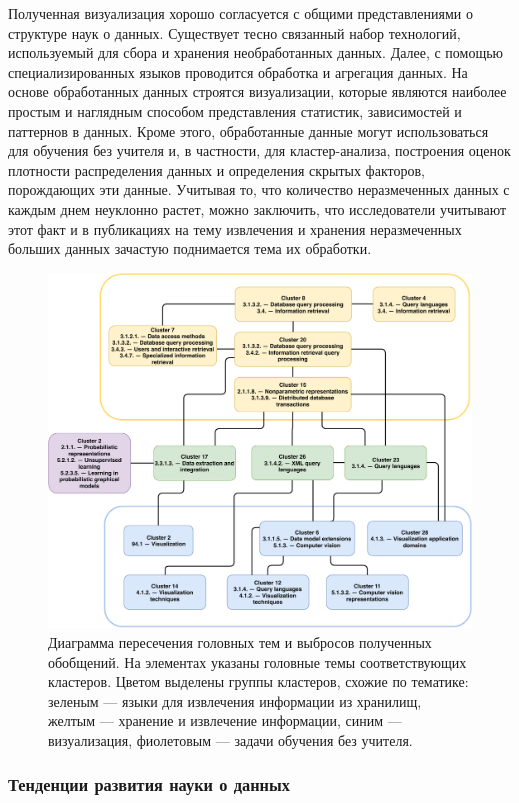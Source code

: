 \documentclass[12pt]{article}
\begin{document}
Полученная визуализация хорошо согласуется с общими представлениями о структуре наук о данных. Существует тесно связанный набор технологий, используемый для сбора и хранения необработанных данных. Далее, с помощью специализированных языков проводится обработка и агрегация данных. На основе обработанных данных строятся визуализации, которые являются наиболее простым и наглядным способом представления статистик, зависимостей и паттернов в данных. Кроме этого, обработанные данные могут использоваться для обучения без учителя и, в частности, для кластер-анализа, построения оценок плотности распределения данных и определения скрытых факторов, порождающих эти данные. Учитывая то, что количество неразмеченных данных с каждым днем неуклонно растет, можно заключить, что исследователи учитывают этот факт и в публикациях на тему извлечения и хранения неразмеченных больших данных зачастую поднимается тема их обработки.


\begin{figure}[h]
	\centering
	\includegraphics[width=0.8\linewidth, clip]{images/clusters_interaction}
	\caption{Диаграмма пересечения головных тем и выбросов полученных обобщений. На элементах указаны головные темы соответствующих кластеров. Цветом выделены группы кластеров, схожие по тематике: зеленым --- языки для извлечения информации из хранилищ, желтым --- хранение и извлечение информации, синим --- визуализация, фиолетовым --- задачи обучения без учителя.}
	\label{fig:clusters_interaction}
\end{figure}


\subsubsection{Тенденции развития науки о данных}
\end{document}
